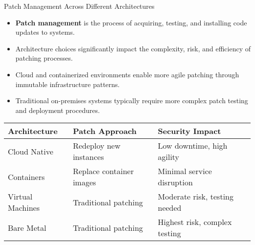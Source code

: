 \documentclass{beamer}
\begin{document}
    \begin{frame}{Patch Management Across Different Architectures}
    \begin{itemize}
    \item \textbf{Patch management} is the process of acquiring, testing, and installing code updates to systems.
    \item Architecture choices significantly impact the complexity, risk, and efficiency of patching processes.
    \item Cloud and containerized environments enable more agile patching through immutable infrastructure patterns.
    \item Traditional on-premises systems typically require more complex patch testing and deployment procedures.
    \end{itemize}
    
    \begin{table}
    \begin{tabular}{lll}
    \toprule
    \textbf{Architecture} & \textbf{Patch Approach} & \textbf{Security Impact} \\
    \midrule
    Cloud Native & Redeploy new instances & Low downtime, high agility \\
    Containers & Replace container images & Minimal service disruption \\
    Virtual Machines & Traditional patching & Moderate risk, testing needed \\
    Bare Metal & Traditional patching & Highest risk, complex testing \\
    \bottomrule
    \end{tabular}
    \end{table}
    \end{frame}
    
\end{document}
